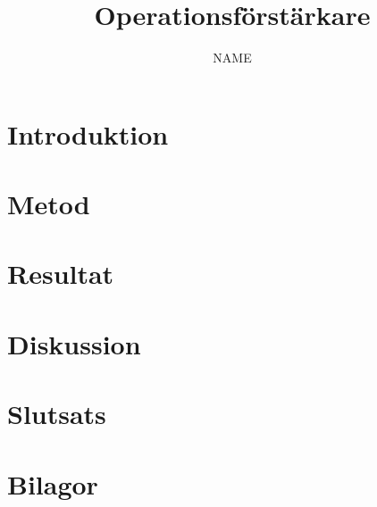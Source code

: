 \documentclass[a4paper, 10pt]{article}
\title{Operationsförstärkare} %
\author{NAME} %
\begin{document}
\thispagestyle{empty}
\setcounter{page}{0}
\maketitle
\newpage

\begin{abstract}
\lipsum[1-2]
\end{abstract}
\newpage
    
\tableofcontents
\newpage

\begin{multicols}{2}
\section{Introduktion}
\section{Metod}
\section{Resultat}
\section{Diskussion}
\section{Slutsats}
\end{multicols}
\printbibliography
\section*{Bilagor}
% 
\end{document}
